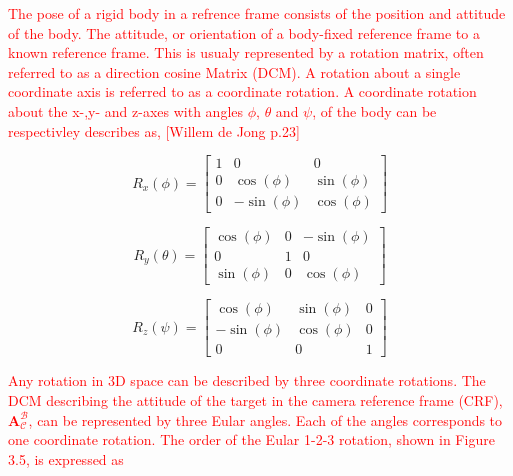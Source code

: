 \label{sec:modrigid}

\label{sec:kinematics}

\textcolor{red}{The pose of a rigid body in a refrence frame consists of the position and attitude of the body. The attitude, or orientation of a body-fixed reference frame to a
known reference frame. This is usualy represented by a rotation matrix, often referred to as a direction cosine Matrix (DCM). A rotation about a single coordinate axis
is referred to as a coordinate rotation. A coordinate rotation about the x-,y- and z-axes with angles $\phi$, $\theta$ and $\psi$, of the body can be respectivley
describes as, [Willem de Jong p.23]}

\begin{equation}
    R_x(\phi) = \begin{bmatrix} 
        1 & 0 & 0 \\
        0 & \cos(\phi) & \sin(\phi) \\
        0 & -\sin(\phi) & \cos(\phi)
    \end{bmatrix}
    \label{Eq:3.1}
\end{equation}

\begin{equation}
    R_y(\theta) = \begin{bmatrix} 
        \cos(\phi) & 0 & -\sin(\phi) \\
        0 & 1 & 0 \\
        \sin(\phi) & 0  & \cos(\phi)
    \end{bmatrix}
    \label{Eq:3.2}
\end{equation}

\begin{equation}
    R_z(\psi) = \begin{bmatrix} 
        \cos(\phi) & \sin(\phi) & 0 \\
        -\sin(\phi) & \cos(\phi) & 0 \\
        0 & 0 & 1
    \end{bmatrix}
    \label{Eq:3.3}
\end{equation}

\textcolor{red}{Any rotation in 3D space can be described by three coordinate rotations. The DCM describing the attitude of the target in the camera reference frame
(CRF), $\mathbf{A}_{\mathcal{C}}^{\mathcal{B}}$, can be represented by three Eular angles. Each of the angles corresponds to one coordinate rotation. The order
of the Eular 1-2-3 rotation, shown in Figure 3.5, is expressed as}


